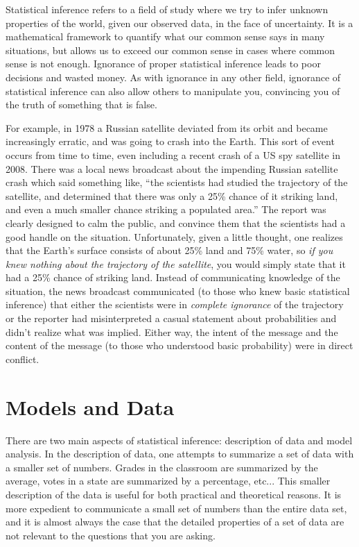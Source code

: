 Statistical inference refers to a field of study where we try to infer unknown properties of the world, given our observed data, in the face of uncertainty.  It is a mathematical framework to quantify what our common sense says in many situations, but allows us to exceed our common sense in cases where common sense is not enough.  Ignorance of proper statistical inference leads to poor decisions and wasted money.  As with ignorance in any other field, ignorance of statistical inference can also allow others to manipulate you, convincing you of the truth of something that is false.

For example, in 1978 a Russian satellite deviated from its orbit and became increasingly erratic, and was going to crash into the Earth.\cite{Heaps:1978qy}  This sort of event occurs from time to time, even including a recent crash of a US spy satellite in 2008.\cite{Oberg:2008fj}  There was a local news broadcast about the impending Russian satellite crash which said something like, ``the scientists had studied the trajectory of the satellite, and determined that there was only a 25\% chance of it striking land, and even a much smaller chance striking a populated area.''  The report was clearly designed to calm the public, and convince them that the scientists had a good handle on the situation.  Unfortunately, given a little thought, one realizes that the Earth's surface consists of about 25\% land and 75\% water, so {\em if you knew nothing about the trajectory of the satellite}, you would simply state that it had a 25\% chance of striking land.  Instead of communicating knowledge of the situation, the news broadcast communicated (to those who knew basic statistical inference) that either the scientists were in \emph{complete ignorance} of the trajectory or the reporter had misinterpreted a casual statement about probabilities and didn't realize what was implied.  Either way, the intent of the message and the content of the message (to those who understood basic probability) were in direct conflict.

\section{Models and Data}

There are two main aspects of statistical inference: description of data and model analysis.  In the description of data, one attempts to summarize a set of data with a smaller set of numbers.  Grades in the classroom are summarized by the average, votes in a state are summarized by a percentage, etc...  This smaller description of the data is useful for both practical and theoretical reasons.  It is more expedient to communicate a small set of numbers than the entire data set, and it is almost always the case that the detailed properties of a set of data are not relevant to the questions that you are asking.


